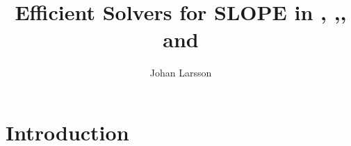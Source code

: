 \documentclass[article]{jss}
\author{Johan Larsson}
\title{Efficient Solvers for SLOPE in \proglang{R}, \proglang{Python},\proglang{Julia}, and \proglang{C++}}
\begin{document}
\section{Introduction}



\newpage

\begin{appendix}

\end{appendix}
\end{document}

